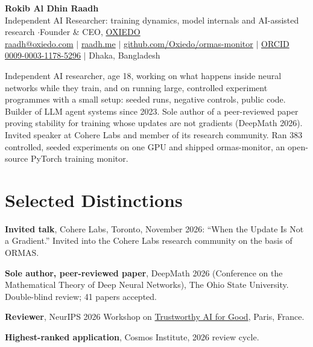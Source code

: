 \documentclass[10pt,a4paper]{article}
\begin{document}
\RaggedRight
\color{body}

\begin{center}
  {\LARGE\bfseries\color{heading} Rokib Al Dhin Raadh}\\[3pt]
  {\small Independent AI Researcher: training dynamics, model internals and AI-assisted research \enspace$\cdot$\enspace Founder \& CEO, \href{https://oxiedo.com}{OXIEDO}}\\[3pt]
  {\footnotesize
    \href{mailto:raadh@oxiedo.com}{raadh@oxiedo.com}
    \enspace$|$\enspace
    \href{https://www.raadh.me}{raadh.me}
    \enspace$|$\enspace
    \href{https://github.com/Oxiedo/ormas-monitor}{github.com/Oxiedo/ormas-monitor}
    \enspace$|$\enspace
    \href{https://orcid.org/0009-0003-1178-5296}{ORCID 0009-0003-1178-5296}
    \enspace$|$\enspace
    {\color{muted}Dhaka, Bangladesh}
  }
\end{center}
\vspace{1pt}

{\small\noindent Independent AI researcher, age 18, working on what happens inside neural networks while they train, and on running large, controlled experiment programmes with a small setup: seeded runs, negative controls, public code. Builder of LLM agent systems since 2023. Sole author of a peer-reviewed paper proving stability for training whose updates are not gradients (DeepMath 2026). Invited speaker at Cohere Labs and member of its research community. Ran 383 controlled, seeded experiments on one GPU and shipped ormas-monitor, an open-source PyTorch training monitor.\par}

\section*{Selected Distinctions}
\begin{bullets}
  \item \textbf{Invited talk}, Cohere Labs, Toronto, November 2026: ``When the Update Is Not a Gradient.'' Invited into the Cohere Labs research community on the basis of ORMAS.
  \item \textbf{Sole author, peer-reviewed paper}, DeepMath 2026 (Conference on the Mathematical Theory of Deep Neural Networks), The Ohio State University. Double-blind review; 41 papers accepted.
  \item \textbf{Reviewer}, NeurIPS 2026 Workshop on \href{https://trustworthy-ai-for-good.github.io/}{Trustworthy AI for Good}, Paris, France.
  \item \textbf{Highest-ranked application}, Cosmos Institute, 2026 review cycle.
\end{bullets}
\end{document}
